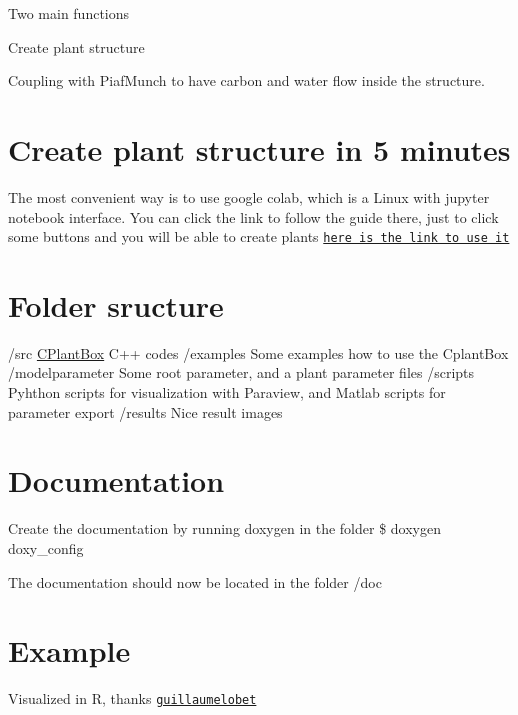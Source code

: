 Two main functions
\begin{DoxyEnumerate}
\item Create plant structure
\item Coupling with Piaf\+Munch to have carbon and water flow inside the structure.
\end{DoxyEnumerate}

\section*{Create plant structure in 5 minutes}

The most convenient way is to use google colab, which is a Linux with jupyter notebook interface. You can click the link to follow the guide there, just to click some buttons and you will be able to create plants \href{https://colab.research.google.com/github/Plant-Root-Soil-Interactions-Modelling/CPlantBox/blob/master/python/CPlantBox_PiafMunch_Tutorial_(include_installation).ipynb}{\tt here is the link to use it}

\section*{Folder sructure}

/src \hyperlink{namespaceCPlantBox}{C\+Plant\+Box} C++ codes /examples Some examples how to use the Cplant\+Box /modelparameter Some root parameter, and a plant parameter files /scripts Pyhthon scripts for visualization with Paraview, and Matlab scripts for parameter export /results Nice result images

\section*{Documentation}

Create the documentation by running doxygen in the folder \$ doxygen doxy\+\_\+config

The documentation should now be located in the folder /doc

\section*{Example}

Visualized in R, thanks \href{https://github.com/guillaumelobet}{\tt guillaumelobet}

 